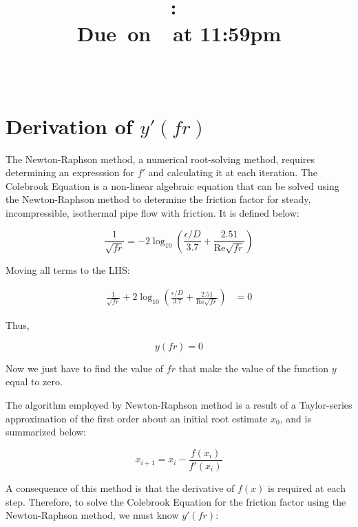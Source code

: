 \documentclass{article}
\title{
    \vspace{2in}
    \textmd{\textbf{\hmwkClass:\ \hmwkTitle}}\\
    \normalsize\vspace{0.1in}\small{Due\ on\ \hmwkDueDate\ at 11:59pm}\\
    \vspace{0.1in}\large{\textit{\hmwkClassInstructor\ \hmwkClassTime}}
    \vspace{3in}
}
\author{\hmwkAuthorName}
\date{}
\begin{document}
\maketitle

\pagebreak

\section{Derivation of $y'(fr)$}

The Newton-Raphson method, a numerical root-solving method, requires determining an expresssion for $f'$ and calculating
it at each iteration. The Colebrook Equation is a non-linear algebraic equation that can be solved using the Newton-Raphson
method to determine the friction factor for steady, incompressible, isothermal pipe flow with friction. It is defined below:

$$ \frac{1}{\sqrt{fr}} = -2\log_{10}\left(\frac{\epsilon/D}{3.7} + \frac{2.51}{\mathrm{Re}\sqrt{fr}}\right) $$

Moving all terms to the LHS:

\begin{align*}
    \frac{1}{\sqrt{fr}} + 2\log_{10}\left(\frac{\epsilon/D}{3.7} + \frac{2.51}{\mathrm{Re}\sqrt{fr}}\right) &= 0
\end{align*}

Thus,

$$ y(fr) = 0 $$

Now we just have to find the value of $fr$ that make the value of the function $y$ equal to zero.

\vspace{\baselineskip}

The algorithm employed by Newton-Raphson method is a result of a Taylor-series approximation of the first order about an
initial root estimate $x_0$, and is summarized below:

$$ x_{i+1} = x_i - \frac{f(x_i)}{f'(x_i)} $$

A consequence of this method is that the derivative of $f(x)$ is required at each step. Therefore, to solve 
the Colebrook Equation for the friction factor using the Newton-Raphson method, we must know $y'(fr)$:
\end{document}
